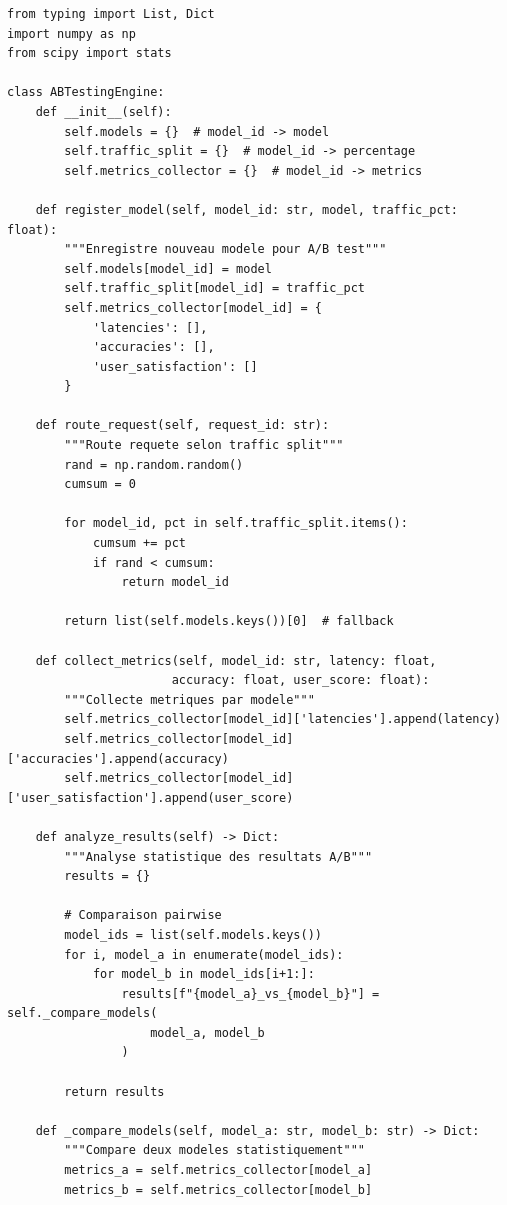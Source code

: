 \documentclass[12pt,a4paper]{article}
\begin{document}
\begin{lstlisting}[caption={A/B Testing Framework}]
from typing import List, Dict
import numpy as np
from scipy import stats

class ABTestingEngine:
    def __init__(self):
        self.models = {}  # model_id -> model
        self.traffic_split = {}  # model_id -> percentage
        self.metrics_collector = {}  # model_id -> metrics
        
    def register_model(self, model_id: str, model, traffic_pct: float):
        """Enregistre nouveau modele pour A/B test"""
        self.models[model_id] = model
        self.traffic_split[model_id] = traffic_pct
        self.metrics_collector[model_id] = {
            'latencies': [],
            'accuracies': [],
            'user_satisfaction': []
        }
        
    def route_request(self, request_id: str):
        """Route requete selon traffic split"""
        rand = np.random.random()
        cumsum = 0
        
        for model_id, pct in self.traffic_split.items():
            cumsum += pct
            if rand < cumsum:
                return model_id
                
        return list(self.models.keys())[0]  # fallback
        
    def collect_metrics(self, model_id: str, latency: float, 
                       accuracy: float, user_score: float):
        """Collecte metriques par modele"""
        self.metrics_collector[model_id]['latencies'].append(latency)
        self.metrics_collector[model_id]['accuracies'].append(accuracy)
        self.metrics_collector[model_id]['user_satisfaction'].append(user_score)
        
    def analyze_results(self) -> Dict:
        """Analyse statistique des resultats A/B"""
        results = {}
        
        # Comparaison pairwise
        model_ids = list(self.models.keys())
        for i, model_a in enumerate(model_ids):
            for model_b in model_ids[i+1:]:
                results[f"{model_a}_vs_{model_b}"] = self._compare_models(
                    model_a, model_b
                )
                
        return results
        
    def _compare_models(self, model_a: str, model_b: str) -> Dict:
        """Compare deux modeles statistiquement"""
        metrics_a = self.metrics_collector[model_a]
        metrics_b = self.metrics_collector[model_b]
        

\end{lstlisting}
\end{document}
